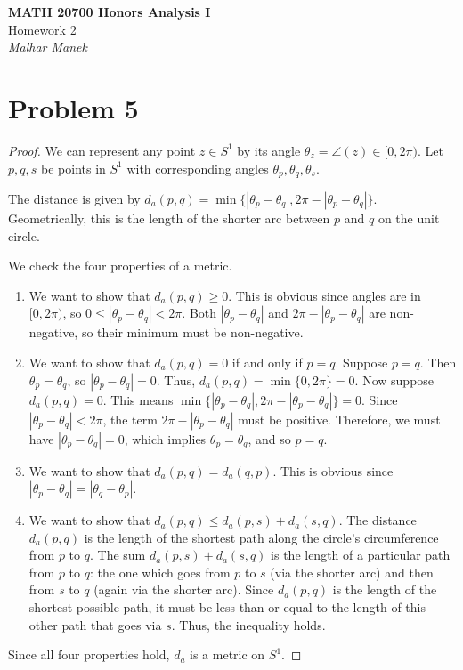 \documentclass[11pt]{article}
\renewcommand{\_}[1]{\underline{ #1 }}
\theoremstyle{definition}
\numberwithin{equation}{subsection}
\begin{document}
\begin{center}
    {\LARGE\bfseries MATH 20700 Honors Analysis I}\\[6pt]
    {\Large Homework 2}\\[6pt]
    {\Large\itshape Malhar Manek}
\end{center}

\bigskip

\section*{Problem 5}
\begin{proof}
We can represent any point $z \in S^1$ by its angle $\theta_z = \angle(z) \in [0, 2\pi)$. Let $p, q, s$ be points in $S^1$ with corresponding angles $\theta_p, \theta_q, \theta_s$.

The distance is given by $d_a(p,q)=\min \{|\theta_p-\theta_q|, 2\pi - |\theta_p-\theta_q|\}$. Geometrically, this is the length of the shorter arc between $p$ and $q$ on the unit circle.

We check the four properties of a metric.

\begin{enumerate}
    \item We want to show that $d_a(p,q)\geq 0$. This is obvious since angles are in $[0, 2\pi)$, so $0\leq |\theta_p-\theta_q|< 2\pi$. Both $|\theta_p-\theta_q|$ and $2\pi - |\theta_p-\theta_q|$ are non-negative, so their minimum must be non-negative.

    \item We want to show that $d_a(p,q)=0$ if and only if $p=q$.
    Suppose $p=q$. Then $\theta_p = \theta_q$, so $|\theta_p-\theta_q|=0$. Thus, $d_a(p,q) = \min\{0, 2\pi\}=0$.
    Now suppose $d_a(p,q)=0$. This means $\min\{|\theta_p-\theta_q|, 2\pi - |\theta_p-\theta_q|\} = 0$. Since $|\theta_p-\theta_q| < 2\pi$, the term $2\pi - |\theta_p-\theta_q|$ must be positive. Therefore, we must have $|\theta_p-\theta_q|=0$, which implies $\theta_p = \theta_q$, and so $p=q$.

    \item We want to show that $d_a(p,q)=d_a(q,p)$. This is obvious since $|\theta_p-\theta_q|=|\theta_q-\theta_p|$.

    \item We want to show that $d_a(p,q) \leq d_a(p,s)+d_a(s,q)$.
    The distance $d_a(p,q)$ is the length of the shortest path along the circle's circumference from $p$ to $q$. The sum $d_a(p,s) + d_a(s,q)$ is the length of a particular path from $p$ to $q$: the one which goes from $p$ to $s$ (via the shorter arc) and then from $s$ to $q$ (again via the shorter arc). Since $d_a(p,q)$ is the length of the shortest possible path, it must be less than or equal to the length of this other path that goes via $s$. Thus, the inequality holds.

\end{enumerate}
Since all four properties hold, $d_a$ is a metric on $S^1$.
\end{proof}
\end{document}

